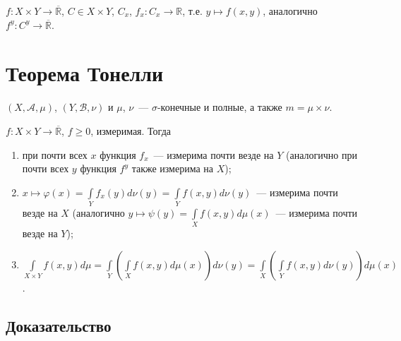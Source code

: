 \documentclass{article}
\begin{document}
            $f : X \times Y \rightarrow \overline{\mathbb{R}}$, $C \in X \times Y$, $C_x$, $f_x : C_x \rightarrow \mathbb{R}$, т.е. $y \mapsto f(x, y)$, аналогично $f^y : C^y \rightarrow \overline{\mathbb{R}}$.
    
    \newpage
    
    \section{Теорема Тонелли}
    
        $(X, \mathcal{A}, \mu)$, $(Y, \mathcal{B}, \nu)$ и $\mu$, $\nu$~--- $\sigma$-конечные и полные, а также $m = \mu \times \nu$.
        
        $f : X \times Y \rightarrow \overline{\mathbb{R}}$, $f \geqslant 0$, измеримая. Тогда
        
        \begin{enumerate}
        
            \item при почти всех $x$ функция $f_x$~--- измерима почти везде на $Y$ (аналогично при почти всех $y$ функция $f^y$ также измерима на $X$);
            
            \item $x \mapsto \varphi(x) = \int\limits_Y f_x(y) d \nu (y) = \int\limits_Y f(x, y) d \nu (y)$~--- измерима почти везде на $X$ (аналогично $y \mapsto \psi(y) = \int\limits_X f(x, y) d \mu(x)$~--- измерима почти везде на $Y$);
            
            \item $\int\limits_{X \times Y} f(x, y) d \mu = \int\limits_{Y} \left( \int\limits_{X} f (x, y) d \mu (x) \right) d \nu (y) = \int\limits_X \left( \int\limits_Y f(x, y) d \nu (y) \right) d \mu (x)$.
            
        \end{enumerate}
        
        \subsection{Доказательство}
        
\end{document}
